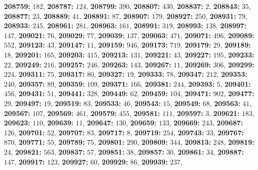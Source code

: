 \textsf{\bfseries 208759:} $182$, \textsf{\bfseries 208787:} $124$, \textsf{\bfseries 208799:} $390$, \textsf{\bfseries 208807:} $430$, \textsf{\bfseries 208837:} $2$, \textsf{\bfseries 208843:} $35$, \textsf{\bfseries 208877:} $23$, \textsf{\bfseries 208889:} $41$, \textsf{\bfseries 208891:} $87$, \textsf{\bfseries 208907:} $179$, \textsf{\bfseries 208927:} $250$, \textsf{\bfseries 208931:} $79$, \textsf{\bfseries 208933:} $245$, \textsf{\bfseries 208961:} $281$, \textsf{\bfseries 208963:} $161$, \textsf{\bfseries 208991:} $319$, \textsf{\bfseries 208993:} $138$, \textsf{\bfseries 208997:} $147$, \textsf{\bfseries 209021:} $76$, \textsf{\bfseries 209029:} $77$, \textsf{\bfseries 209039:} $137$, \textsf{\bfseries 209063:} $471$, \textsf{\bfseries 209071:} $496$, \textsf{\bfseries 209089:} $552$, \textsf{\bfseries 209123:} $43$, \textsf{\bfseries 209147:} $11$, \textsf{\bfseries 209159:} $946$, \textsf{\bfseries 209173:} $719$, \textsf{\bfseries 209179:} $29$, \textsf{\bfseries 209189:} $18$, \textsf{\bfseries 209201:} $165$, \textsf{\bfseries 209203:} $415$, \textsf{\bfseries 209213:} $131$, \textsf{\bfseries 209221:} $43$, \textsf{\bfseries 209227:} $195$, \textsf{\bfseries 209233:} $22$, \textsf{\bfseries 209249:} $216$, \textsf{\bfseries 209257:} $246$, \textsf{\bfseries 209263:} $143$, \textsf{\bfseries 209267:} $11$, \textsf{\bfseries 209269:} $306$, \textsf{\bfseries 209299:} $224$, \textsf{\bfseries 209311:} $75$, \textsf{\bfseries 209317:} $80$, \textsf{\bfseries 209327:} $19$, \textsf{\bfseries 209333:} $78$, \textsf{\bfseries 209347:} $212$, \textsf{\bfseries 209353:} $240$, \textsf{\bfseries 209357:} $89$, \textsf{\bfseries 209359:} $109$, \textsf{\bfseries 209371:} $166$, \textsf{\bfseries 209381:} $244$, \textsf{\bfseries 209393:} $5$, \textsf{\bfseries 209401:} $456$, \textsf{\bfseries 209431:} $51$, \textsf{\bfseries 209441:} $328$, \textsf{\bfseries 209449:} $62$, \textsf{\bfseries 209459:} $104$, \textsf{\bfseries 209471:} $902$, \textsf{\bfseries 209477:} $29$, \textsf{\bfseries 209497:} $19$, \textsf{\bfseries 209519:} $83$, \textsf{\bfseries 209533:} $46$, \textsf{\bfseries 209543:} $15$, \textsf{\bfseries 209549:} $68$, \textsf{\bfseries 209563:} $41$, \textsf{\bfseries 209567:} $107$, \textsf{\bfseries 209569:} $461$, \textsf{\bfseries 209579:} $455$, \textsf{\bfseries 209581:} $111$, \textsf{\bfseries 209597:} $3$, \textsf{\bfseries 209621:} $183$, \textsf{\bfseries 209623:} $110$, \textsf{\bfseries 209639:} $11$, \textsf{\bfseries 209647:} $130$, \textsf{\bfseries 209659:} $133$, \textsf{\bfseries 209669:} $243$, \textsf{\bfseries 209687:} $126$, \textsf{\bfseries 209701:} $52$, \textsf{\bfseries 209707:} $83$, \textsf{\bfseries 209717:} $8$, \textsf{\bfseries 209719:} $254$, \textsf{\bfseries 209743:} $33$, \textsf{\bfseries 209767:} $870$, \textsf{\bfseries 209771:} $55$, \textsf{\bfseries 209789:} $75$, \textsf{\bfseries 209801:} $290$, \textsf{\bfseries 209809:} $344$, \textsf{\bfseries 209813:} $248$, \textsf{\bfseries 209819:} $24$, \textsf{\bfseries 209821:} $563$, \textsf{\bfseries 209837:} $57$, \textsf{\bfseries 209851:} $38$, \textsf{\bfseries 209857:} $30$, \textsf{\bfseries 209861:} $34$, \textsf{\bfseries 209887:} $147$, \textsf{\bfseries 209917:} $123$, \textsf{\bfseries 209927:} $60$, \textsf{\bfseries 209929:} $86$, \textsf{\bfseries 209939:} $237$, 
